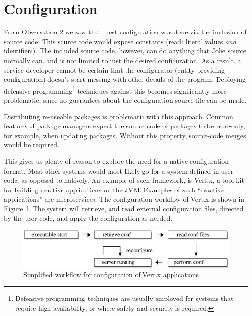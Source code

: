 \section{Configuration}
\label{sec:col}

From Observation 2 we saw that most configuration was done via the inclusion of
source code. This source code would expose constants (read: literal values
\emph{and} identifiers). The included source code, however, can do anything
that Jolie source normally can, and is not limited to just the desired
configuration. As a result, a service developer cannot be certain that the
configurator (entity providing configuration) doesn't start messing with
other details of the program. Deploying defensive
programming\footnote{Defensive programming techniques are usually employed for
systems that require high availability, or where safety and security is
required\autocite{Jon05}.} techniques against this becomes significantly more
problematic, since no guarantees about the configuration source file can
be made.

Distributing re-useable packages is problematic with this approach. Common
features of package managers expect the source code of packages to be
read-only, for example, when updating packages. Without this property,
    source-code merges would be required.

This gives us plenty of reason to explore the need for a native configuration
format.  Most other systems would most likely go for a system defined in user
code, as opposed to natively. An example of such framework, is Vert.x, a
tool-kit for building reactive applications on the JVM.  Examples of such
``reactive applications'' are microservices. The configuration workflow of
Vert.x\autocite{VERTA} is shown in Figure \ref{fig:normal_conf}. The system
will retrieve, and read external configuration files, directed by the user
code, and apply the configuration as needed.


\begin{figure}[H]
\centering
\includegraphics[width=1.0\textwidth]{modules/normal_conf.eps}
\caption{Simplified workflow for configuration of Vert.x applications}
\label{fig:normal_conf}
\end{figure}

